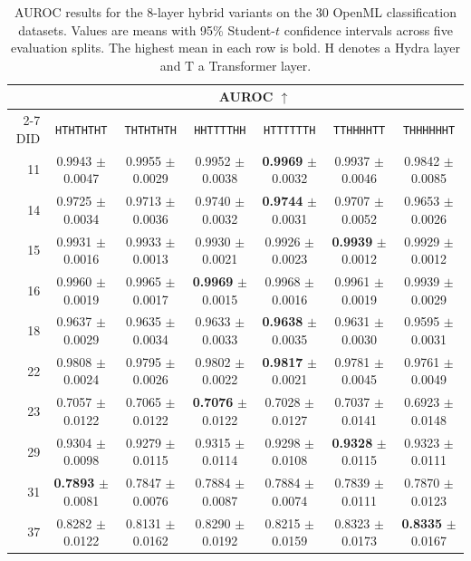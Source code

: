 \begin{table}[t]
\centering
\caption{AUROC results for the 8-layer hybrid variants on the 30 OpenML classification datasets. Values are means with 95\% Student-$t$ confidence intervals across five evaluation splits. The highest mean in each row is bold. $\mathrm{H}$ denotes a Hydra layer and $\mathrm{T}$ a Transformer layer.}
\label{tab:hybrid_variants_auc}
\setlength{\tabcolsep}{4pt}
\renewcommand{\arraystretch}{1.04}
\scriptsize
\begin{tabular*}{\textwidth}{@{\extracolsep{\fill}}rcccccc@{}}
\toprule
& \multicolumn{6}{c}{AUROC $\uparrow$} \\
\cmidrule(lr){2-7}
DID & \texttt{HTHTHTHT} & \texttt{THTHTHTH} & \texttt{HHTTTTHH} & \texttt{HTTTTTTH} & \texttt{TTHHHHTT} & \texttt{THHHHHHT} \\
\midrule
11 & 0.9943 $\pm$ 0.0047 & 0.9955 $\pm$ 0.0029 & 0.9952 $\pm$ 0.0038 & \textbf{0.9969} $\pm$ 0.0032 & 0.9937 $\pm$ 0.0046 & 0.9842 $\pm$ 0.0085 \\
14 & 0.9725 $\pm$ 0.0034 & 0.9713 $\pm$ 0.0036 & 0.9740 $\pm$ 0.0032 & \textbf{0.9744} $\pm$ 0.0031 & 0.9707 $\pm$ 0.0052 & 0.9653 $\pm$ 0.0026 \\
15 & 0.9931 $\pm$ 0.0016 & 0.9933 $\pm$ 0.0013 & 0.9930 $\pm$ 0.0021 & 0.9926 $\pm$ 0.0023 & \textbf{0.9939} $\pm$ 0.0012 & 0.9929 $\pm$ 0.0012 \\
16 & 0.9960 $\pm$ 0.0019 & 0.9965 $\pm$ 0.0017 & \textbf{0.9969} $\pm$ 0.0015 & 0.9968 $\pm$ 0.0016 & 0.9961 $\pm$ 0.0019 & 0.9939 $\pm$ 0.0029 \\
18 & 0.9637 $\pm$ 0.0029 & 0.9635 $\pm$ 0.0034 & 0.9633 $\pm$ 0.0033 & \textbf{0.9638} $\pm$ 0.0035 & 0.9631 $\pm$ 0.0030 & 0.9595 $\pm$ 0.0031 \\
22 & 0.9808 $\pm$ 0.0024 & 0.9795 $\pm$ 0.0026 & 0.9802 $\pm$ 0.0022 & \textbf{0.9817} $\pm$ 0.0021 & 0.9781 $\pm$ 0.0045 & 0.9761 $\pm$ 0.0049 \\
23 & 0.7057 $\pm$ 0.0122 & 0.7065 $\pm$ 0.0122 & \textbf{0.7076} $\pm$ 0.0122 & 0.7028 $\pm$ 0.0127 & 0.7037 $\pm$ 0.0141 & 0.6923 $\pm$ 0.0148 \\
29 & 0.9304 $\pm$ 0.0098 & 0.9279 $\pm$ 0.0115 & 0.9315 $\pm$ 0.0114 & 0.9298 $\pm$ 0.0108 & \textbf{0.9328} $\pm$ 0.0115 & 0.9323 $\pm$ 0.0111 \\
31 & \textbf{0.7893} $\pm$ 0.0081 & 0.7847 $\pm$ 0.0076 & 0.7884 $\pm$ 0.0087 & 0.7884 $\pm$ 0.0074 & 0.7839 $\pm$ 0.0111 & 0.7870 $\pm$ 0.0123 \\
37 & 0.8282 $\pm$ 0.0122 & 0.8131 $\pm$ 0.0162 & 0.8290 $\pm$ 0.0192 & 0.8215 $\pm$ 0.0159 & 0.8323 $\pm$ 0.0173 & \textbf{0.8335} $\pm$ 0.0167 \\

\end{tabular*}
\end{table}
